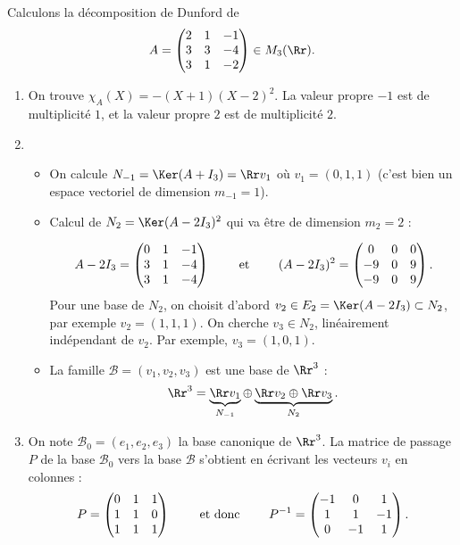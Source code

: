 \documentclass[12pt, class=report,crop=false]{standalone}
\begin{document}
\begin{exemple}
Calculons la décomposition de Dunford de
$$A=\begin{pmatrix}2&1&-1\cr 3&3&-4\cr 3&1&-2\end{pmatrix} \in M_3(\Rr).$$

\begin{enumerate}
  \item On trouve $\chi_A(X)=-(X+1)(X-2)^2$.
 La valeur propre $-1$ est de multiplicité $1$, et la valeur propre $2$ est de multiplicité $2$.  
 
  \item 
  \begin{itemize}
    \item On calcule $N_{-1}=\Ker(A+I_3) = \Rr v_1$ où $v_1 =(0,1,1)$ (c'est bien un espace vectoriel de dimension $m_{-1} = 1$).
    
    \item Calcul de $N_2=\Ker(A-2I_3)^2$ qui va être de dimension $m_2=2$ :
    
    $$A-2I_3 = \begin{pmatrix}0&1&-1\cr 3&1&-4\cr 3&1&-4\end{pmatrix}
    \qquad \text{ et } \qquad 
    (A-2I_3)^2 = \begin{pmatrix}0&0&0\cr -9&0&9\cr -9&0&9\end{pmatrix}.$$
    Pour une base de $N_2$, on choisit d'abord 
    $v_2 \in E_2 = \Ker(A-2I_3) \subset N_2$, 
    par exemple $v_2 = (1,1,1)$.
    On cherche $v_3 \in N_2$, linéairement indépendant de $v_2$.
    Par exemple, $v_3 = (1,0,1)$. 
    
    \item La famille $\mathcal{B} = (v_1,v_2,v_3)$ est une base de $\Rr^3$ :
    $$\Rr^3 = \underbrace{\Rr v_1 }_{N_{-1}} \oplus \underbrace{\Rr v_2 \oplus \Rr v_3}_{N_2}.$$
    
  \end{itemize}  
  
  \item On note $\mathcal{B}_0 = (e_1,e_2,e_3)$ la base canonique de $\Rr^3$.
  La matrice de passage $P$ de la base $\mathcal{B}_0$ vers la base $\mathcal{B}$ s'obtient en écrivant les vecteurs $v_i$ en colonnes :
  $$P=\begin{pmatrix}0&1&1\cr 1&1&0\cr1&1&1\end{pmatrix}
  \qquad \text{ et donc } \qquad 
  P^{-1} = \begin{pmatrix}-1 & 0 & 1 \\1 & 1 & -1 \\0 & -1 & 1\end{pmatrix}.$$
  

\end{enumerate}
\end{exemple}
\end{document}
